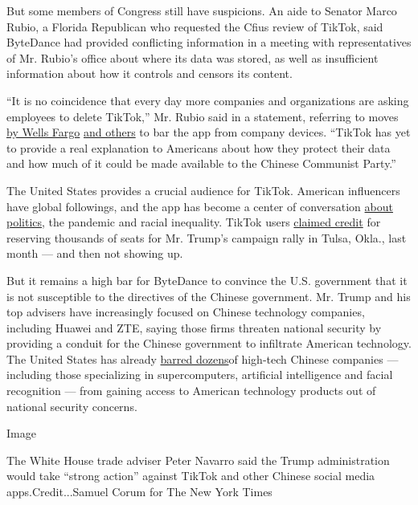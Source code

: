 But some members of Congress still have suspicions. An aide to Senator
Marco Rubio, a Florida Republican who requested the Cfius review of
TikTok, said ByteDance had provided conflicting information in a meeting
with representatives of Mr. Rubio's office about where its data was
stored, as well as insufficient information about how it controls and
censors its content.

``It is no coincidence that every day more companies and organizations
are asking employees to delete TikTok,'' Mr. Rubio said in a statement,
referring to moves
\href{https://www.cnn.com/2020/07/13/tech/tiktok-wells-fargo/index.html}{by
Wells Fargo}
\href{https://www.nytimes3xbfgragh.onion/2020/07/10/technology/tiktok-amazon-security-risk.html}{and
others} to bar the app from company devices. ``TikTok has yet to provide
a real explanation to Americans about how they protect their data and
how much of it could be made available to the Chinese Communist Party.''

The United States provides a crucial audience for TikTok. American
influencers have global followings, and the app has become a center of
conversation
\href{https://www.nytimes3xbfgragh.onion/2020/02/27/style/tiktok-politics-bernie-trump.html}{about
politics}, the pandemic and racial inequality. TikTok users
\href{https://www.nytimes3xbfgragh.onion/2020/06/21/style/tiktok-trump-rally-tulsa.html}{claimed
credit} for reserving thousands of seats for Mr. Trump's campaign rally
in Tulsa, Okla., last month --- and then not showing up.

But it remains a high bar for ByteDance to convince the U.S. government
that it is not susceptible to the directives of the Chinese government.
Mr. Trump and his top advisers have increasingly focused on Chinese
technology companies, including Huawei and ZTE, saying those firms
threaten national security by providing a conduit for the Chinese
government to infiltrate American technology. The United States has
already
\href{https://www.nytimes3xbfgragh.onion/2019/10/23/business/trump-technology-china-trade.html}{barred
dozens}of high-tech Chinese companies --- including those specializing
in supercomputers, artificial intelligence and facial recognition ---
from gaining access to American technology products out of national
security concerns.

Image

The White House trade adviser Peter Navarro said the Trump
administration would take ``strong action'' against TikTok and other
Chinese social media apps.Credit...Samuel Corum for The New York Times

